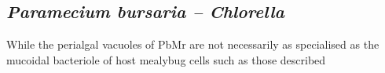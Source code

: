 \subsection{\textit{Paramecium bursaria – Chlorella}}

While the perialgal vacuoles of PbMr are not necessarily as specialised as the 
mucoidal bacteriole of host mealybug cells such as those described \citep{vonDohlen2001}

%

